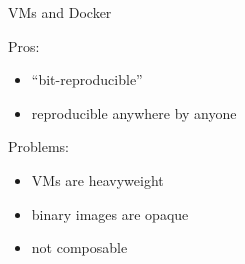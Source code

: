\documentclass{beamer}
\begin{document}
\begin{frame}{VMs and Docker}


  \Large{
    Pros:
    \begin{itemize}
    \item ``bit-reproducible''

    \item reproducible anywhere by anyone
    \end{itemize}
  }

  \Large{
    Problems:
    \begin{itemize}
    \item VMs are heavyweight


    \item binary images are opaque



    \item not composable
    \end{itemize}
  }
\end{frame}
\end{document}
